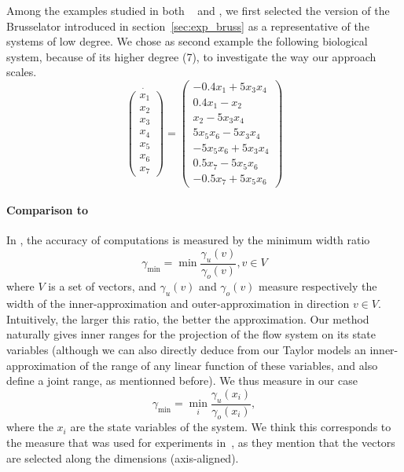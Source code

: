 
Among the examples studied in both ~\cite{Underapproxflowpipes} and \cite{underapprox16}, we first selected
the version of the Brusselator introduced in section~\ref{sec:exp_bruss} as a representative of the systems of low degree. 
We chose as second example the following biological system, because of its higher degree (7), to investigate the way our approach scales. 
\begin{equation}
\dot{\left(\begin{array}{c}
x_1 \\
x_2 \\
x_3 \\
x_4 \\
x_5 \\
x_6 \\
x_7
\end{array}\right)} = \left(\begin{array}{c}
-0.4x_1+5x_3x_4 \\
0.4x_1-x_2 \\
x_2-5x_3x_4 \\
5x_5x_6-5x_3x_4 \\
-5x_5x_6+5x_3x_4 \\
0.5x_7-5x_5x_6 \\
-0.5x_7+5x_5x_6
\end{array}\right)
\end{equation}

\paragraph{Comparison to \cite{Underapproxflowpipes}}
In  \cite{Underapproxflowpipes}, the  accuracy of computations is measured by the minimum width ratio 
\[ \gamma_{\min}=\min{\frac{\gamma_u(v)}{\gamma_o(v)}}, v \in V \]
where $V$ is a set of vectors, and $\gamma_u(v)$ and $\gamma_o(v)$ measure respectively the width of the inner-approximation and outer-approximation
in direction $v \in V$. 
Intuitively, the larger this ratio, the better the approximation. 
Our method naturally gives inner ranges for the projection of the flow system on its state variables (although we can also directly deduce from our Taylor models 
an inner-approximation of the range of any linear function of these variables, and also define a joint range, as 
mentionned before).
We thus measure in our case \[ \gamma_{\min}=\min_{i}{\frac{\gamma_u(x_i)}{\gamma_o(x_i)}}, \]
where the $x_i$ are the state variables of the system. We think this corresponds to the measure that was used for experiments 
in~\cite{Underapproxflowpipes}, as they mention that the vectors are selected along the dimensions (axis-aligned).

